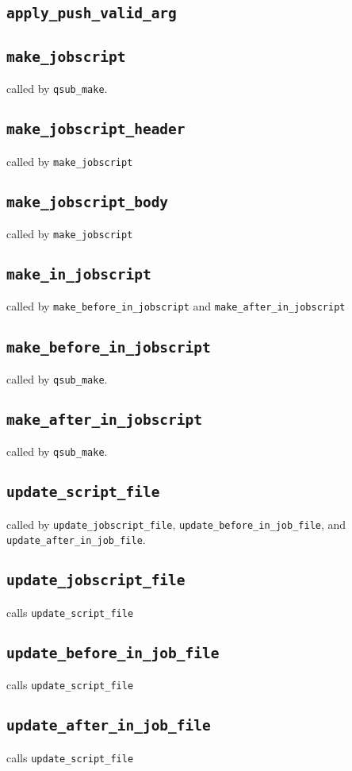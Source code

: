 \documentclass[a4paper,10pt]{report}
\def\|{\verb|} %|
\begin{document}
\subsection{\texttt{apply\_push\_valid\_arg}}
%
\subsection{\texttt{make\_jobscript}}
called by \|qsub_make|.
\subsection{\texttt{make\_jobscript\_header}}
called by \|make_jobscript|
\subsection{\texttt{make\_jobscript\_body}}
called by \|make_jobscript|
%
\subsection{\texttt{make\_in\_jobscript}}
called by \|make_before_in_jobscript| and \|make_after_in_jobscript|
\subsection{\texttt{make\_before\_in\_jobscript}}
called by \|qsub_make|.
\subsection{\texttt{make\_after\_in\_jobscript}}
called by \|qsub_make|.
%
\subsection{\texttt{update\_script\_file}}
called by \|update_jobscript_file|, \|update_before_in_job_file|, and \|update_after_in_job_file|.
\subsection{\texttt{update\_jobscript\_file}}
calls \|update_script_file|
\subsection{\texttt{update\_before\_in\_job\_file}}
calls \|update_script_file|
\subsection{\texttt{update\_after\_in\_job\_file}}
calls \|update_script_file|
\end{document}
